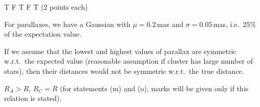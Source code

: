 T F T F T \hfill(2 points each)

For parallaxes, we have a Gaussian with $\mu = 0.2$\,mas and
$\sigma = 0.05$\,mas, i.e.\ 25\% of the expectation value.

If we assume that the lowest and highest values of parallax are symmetric
w.r.t.\ the expected value (reasonable assumption if cluster has large
number of stars), then their distances would not be symmetric w.r.t.\ the
true distance.

$R_A > R$, $R_C = R$ (for statements (m) and (o), marks will be given only
if this relation is stated).
